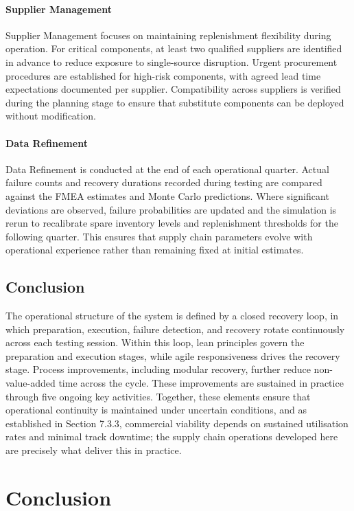 \documentclass[11pt, a4paper]{report}
\numberwithin{equation}{section}
\begin{document}
\begin{refsection}
\paragraph{Supplier Management}
Supplier Management focuses on maintaining replenishment flexibility during operation. For critical components, at least two qualified suppliers are identified in advance to reduce exposure to single-source disruption. Urgent procurement procedures are established for high-risk components, with agreed lead time expectations documented per supplier. Compatibility across suppliers is verified during the planning stage to ensure that substitute components can be deployed without modification.

\paragraph{Data Refinement}
Data Refinement is conducted at the end of each operational quarter. Actual failure counts and recovery durations recorded during testing are compared against the FMEA estimates and Monte Carlo predictions. Where significant deviations are observed, failure probabilities are updated and the simulation is rerun to recalibrate spare inventory levels and replenishment thresholds for the following quarter. This ensures that supply chain parameters evolve with operational experience rather than remaining fixed at initial estimates.

\subsection{Conclusion}

The operational structure of the system is defined by a closed recovery loop, in which preparation, execution, failure detection, and recovery rotate continuously across each testing session. Within this loop, lean principles govern the preparation and execution stages, while agile responsiveness drives the recovery stage. Process improvements, including modular recovery, further reduce non-value-added time across the cycle. These improvements are sustained in practice through five ongoing key activities. Together, these elements ensure that operational continuity is maintained under uncertain conditions,  and as established in Section 7.3.3, commercial viability depends on sustained utilisation rates and minimal track downtime; the supply chain operations developed here are precisely what deliver this in practice.

\section{Conclusion}


\end{refsection}
\end{document}
